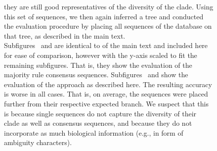 \begin{figure}[hpbt]
{        they are still good representatives of the diversity of the clade.
        Using this set of sequences, we then again inferred a tree and
        conducted the evaluation procedure by placing all sequences of the database on that tree,
        as described in the main text.
        \\
        Subfigures~
        and  are identical to
         of the main text and included here for ease of comparison,
        however with the y-axis scaled to fit the remaining subfigures.
        That is, they show the evaluation of the majority rule consensus sequences.
        Subfigures~ and 
        show the evaluation of the approach as described here.
        The resulting accuracy is worse in all cases.
        That is, on average, the sequences were placed further from their respective expected branch.
        We suspect that this is because single sequences do not capture the diversity of their clade
        as well as consensus sequences, and because they do not incorporate as much biological information
        (e.g., in form of ambiguity characters).
    }
    \label{fig:single_seqs}
\end{figure}



